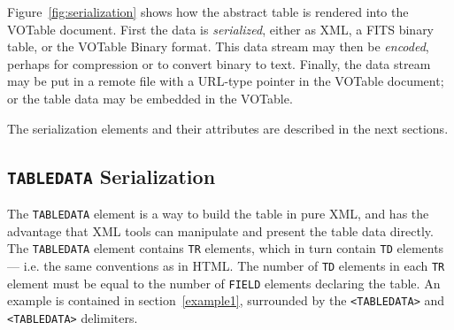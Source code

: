 \documentclass[11pt,a4paper]{ivoa}
\def\Aref#1{section~\ref{#1}}
\def\Fref#1{Figure~\ref{#1}}
\let\fg=\color
\def\slash {{\fg{blue}/}}
\def\elem#1{{\tt{\fg{DarkRed}#1}}}
\def\elemdef#1#2{{\tt\fg{blue}<}{\tt{\fg{DarkRed}#1}#2}{\tt\fg{blue}>}}
\begin{document}
\Fref{fig:serialization}
shows how the abstract table is rendered into the
VOTable document. First the data is {\it serialized}, either
as XML, a FITS binary table, or the VOTable
Binary format. This data stream may then be {\it encoded},
perhaps for compression or to convert binary to text. Finally, the
data stream may be put in a remote file with a URL-type pointer in
the VOTable document; or the table data may be embedded in the
VOTable.


The serialization elements and their attributes are
described in the next sections.

\subsection{\elem{TABLEDATA} Serialization}
\label{sec:TABLEDATA}
\label{elem:TD}
\label{elem:TR}

The \elem{TABLEDATA} element is a way to build the table in pure XML,
and has the advantage that XML tools can manipulate and present
the table data directly.
The \elem{TABLEDATA} element  contains {\elem{TR}}
elements, which in turn contain {\elem{TD}}
elements --- i.e. the same conventions as in HTML.
The number of {\elem{TD}} elements in each {\elem{TR}} element
must be equal to the number of {\elem{FIELD}} elements declaring the table.
An example is contained in \Aref{example1},
surrounded by the \elemdef{TABLEDATA}{} and \elemdef{\slash TABLEDATA}{}
delimiters.
\end{document}
